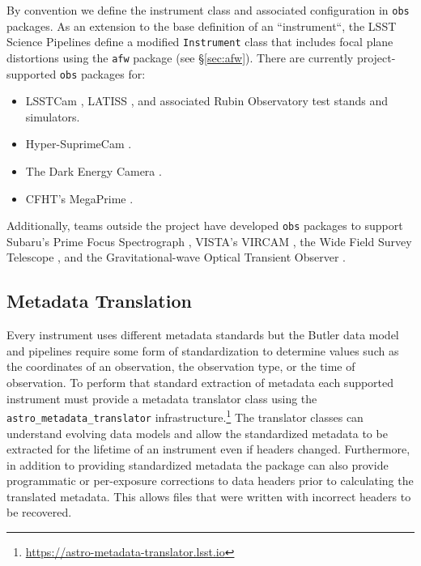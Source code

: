 By convention we define the instrument class and associated configuration in \texttt{obs} packages.
As an extension to the base definition of an ``instrument``, the LSST Science Pipelines define a modified \texttt{Instrument} class that includes focal plane distortions using the \texttt{afw} package (see \S\ref{sec:afw}).
There are currently project-supported \texttt{obs} packages for:

\begin{itemize}
\item LSSTCam \citep{2024SPIE13096E..1SR,2024SPIE13096E..1OL, 2024SPIE13103E..0WU,2010SPIE.7735E..0JK}, LATISS \citep{2020SPIE11452E..0UI}, and associated Rubin Observatory test stands and simulators.
\item Hyper-SuprimeCam \citep{2018PASJ...70S...1M}.
\item The Dark Energy Camera \citep{2015AJ....150..150F,2008SPIE.7014E..0ED}.
\item CFHT's MegaPrime \citep{2003SPIE.4841...72B}.
\end{itemize}

Additionally, teams outside the project have developed \texttt{obs} packages to support Subaru's Prime Focus Spectrograph \citep{2020SPIE11447E..7VW}, VISTA's VIRCAM \citep{2015A&A...575A..25S},
the Wide Field Survey Telescope \citep[WFST;][]{2025arXiv250115018C}, and the Gravitational-wave Optical Transient Observer \citep[GOTO;][]{2021PASA...38....4M}.

\subsection{Metadata Translation}

Every instrument uses different metadata standards but the Butler data model and pipelines require some form of standardization to determine values such as the coordinates of an observation, the observation type, or the time of observation.
To perform that standard extraction of metadata each supported instrument must provide a metadata translator class using the \texttt{astro\_metadata\_translator} infrastructure.\footnote{\url{https://astro-metadata-translator.lsst.io}}
The translator classes can understand evolving data models and allow the standardized metadata to be extracted for the lifetime of an instrument even if headers changed.
Furthermore, in addition to providing standardized metadata the package can also provide programmatic or per-exposure corrections to data headers prior to calculating the translated metadata.
This allows files that were written with incorrect headers to be recovered.
